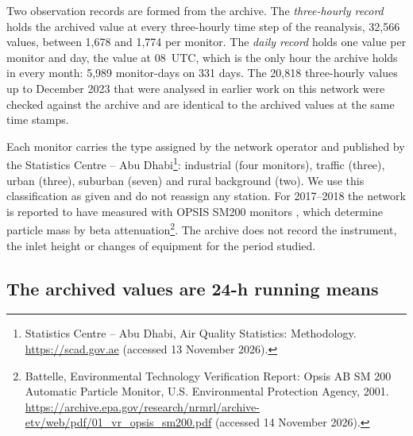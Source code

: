 Two observation records are formed from the archive. The \emph{three-hourly record} holds the
archived value at every three-hourly time step of the reanalysis, 32,566 values, between 1,678
and 1,774 per monitor. The \emph{daily record} holds one value per monitor and day, the value at
08~UTC, which is the only hour the archive holds in every month: 5,989 monitor-days on 331 days.
The 20,818 three-hourly values up to December 2023 that were analysed in earlier work on this
network were checked against the archive and are identical to the archived values at the same
time stamps.

Each monitor carries the type assigned by the network operator and published by the Statistics
Centre -- Abu Dhabi\footnote{Statistics Centre -- Abu Dhabi, Air Quality Statistics: Methodology. \url{https://scad.gov.ae} (accessed 13 November 2026).}: industrial (four monitors), traffic (three), urban
(three), suburban (seven) and rural background (two). We use this classification as given and do
not reassign any station. For 2017--2018 the network is reported to have measured \pmten{} with
OPSIS SM200 monitors \citep{abuelgasim2020}, which determine particle mass by beta
attenuation\footnote{Battelle, Environmental Technology Verification Report: Opsis AB SM 200
Automatic Particle Monitor, U.S. Environmental Protection Agency, 2001.
\url{https://archive.epa.gov/research/nrmrl/archive-etv/web/pdf/01_vr_opsis_sm200.pdf}
(accessed 14 November 2026).}. The archive does not record the instrument, the inlet height or
changes of equipment for the period studied.

\subsection{The archived values are 24-h running means}
\label{sec:running}


